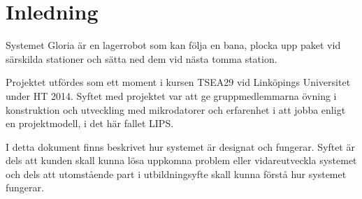 
\section{Inledning}

Systemet Gloria är en lagerrobot som kan följa en bana, plocka upp paket vid särskilda stationer och sätta ned dem vid nästa tomma station.

Projektet utfördes som ett moment i kursen TSEA29 vid Linköpings Universitet under HT 2014\cite{tsea29}. Syftet med projektet var att ge gruppmedlemmarna övning i konstruktion och utveckling med mikrodatorer och erfarenhet i att jobba enligt en projektmodell, i det här fallet LIPS.

I detta dokument finns beskrivet hur systemet är designat och fungerar. Syftet är dels att kunden skall kunna lösa uppkomna problem eller vidareutveckla systemet och dels att utomstående part i utbildningsyfte skall kunna förstå hur systemet fungerar.
